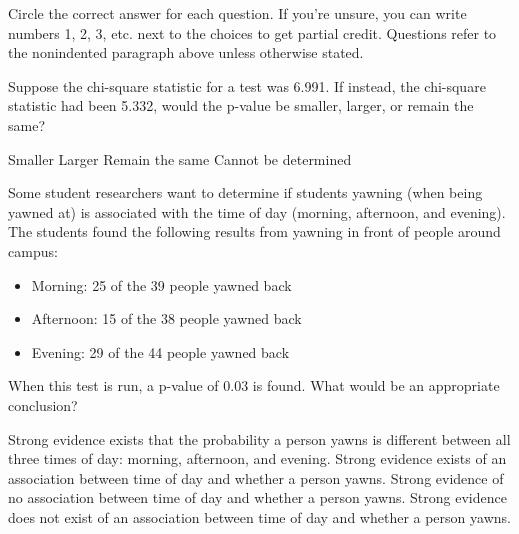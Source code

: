 \documentclass{article}
\begin{document}
	Circle the correct answer for each question.  If you're unsure, you can write numbers 1, 2, 3, etc. next to the choices to get partial credit.  Questions refer to the nonindented paragraph above unless otherwise stated.\\[.5cm]
	
	\begin{mcquestions}
		
		\question Suppose the chi-square statistic for a test was 6.991. If instead, the chi-square statistic had been 5.332, would the p-value be smaller, larger, or remain the same?
		\begin{mcanswerslist}
			\answer Smaller
			\answer[correct] Larger
			\answer Remain the same
			\answer Cannot be determined
		\end{mcanswerslist}
		
		\begin{mcquestioninstruction}
			Some student researchers want to determine if students yawning (when being yawned at) is associated with the time of day (morning, afternoon, and evening). The students found the following results from yawning in front of people around campus:
			\begin{itemize}
				\item Morning: 25 of the 39 people yawned back
				\item Afternoon: 15 of the 38 people yawned back
				\item Evening: 29 of the 44 people yawned back
			\end{itemize}
		\end{mcquestioninstruction}
		\question When this test is run, a p-value of 0.03 is found. What would be an appropriate conclusion?
		\begin{mcanswerslist}
			\answer Strong evidence exists that the probability a person yawns is different between all three times of day: morning, afternoon, and evening.
			\answer[correct] Strong evidence exists of an association between time of day and whether a person yawns.
			\answer Strong evidence of no association between time of day and whether a person yawns.
			\answer Strong evidence does not exist of an association between time of day and whether a person yawns.
		\end{mcanswerslist}
		

\end{mcquestions}
\end{document}
